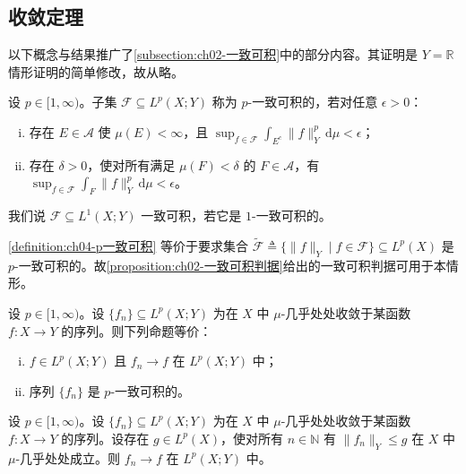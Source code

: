 \documentclass[../../main.tex]{subfiles}%
\begin{document}
\subsection{收敛定理}\label{subsection:ch04-收敛定理}

以下概念与结果推广了\cref{subsection:ch02-一致可积}中的部分内容。其证明是 $Y=\mathbb{R}$ 情形证明的简单修改，故从略。

\begin{definition}[$p$-一致可积]\label{definition:ch04-p一致可积}
设 $p\in[1,\infty)$。子集 $\mathcal{F}\subseteq L^p(X;Y)$ 称为 $p$-一致可积的，若对任意 $\epsilon>0$：
\begin{enumerate}[(i)]
\item\label{item:ch04-p一致可积-i} 存在 $E\in\mathcal{A}$ 使 $\mu(E)<\infty$，且 $\sup_{f\in\mathcal{F}}\int_{E^c}\|f\|_Y^p\,\mathrm{d}\mu<\epsilon$；
\item\label{item:ch04-p一致可积-ii} 存在 $\delta>0$，使对所有满足 $\mu(F)<\delta$ 的 $F\in\mathcal{A}$，有 $\sup_{f\in\mathcal{F}}\int_F\|f\|_Y^p\,\mathrm{d}\mu<\epsilon$。
\end{enumerate}
我们说 $\mathcal{F}\subseteq L^1(X;Y)$ 一致可积，若它是 $1$-一致可积的。
\end{definition}

\begin{remark}\label{remark:ch04-p一致可积}
\cref{definition:ch04-p一致可积} 等价于要求集合 $\widetilde{\mathcal{F}}\triangleq \{\|f\|_Y\mid f\in\mathcal{F}\}\subseteq L^p(X)$ 是 $p$-一致可积的。故\cref{proposition:ch02-一致可积判据}给出的一致可积判据可用于本情形。
\end{remark}

\begin{theorem}[Vitali]\label{theorem:ch04-Vitali}
设 $p\in[1,\infty)$。设 $\{f_n\}\subseteq L^p(X;Y)$ 为在 $X$ 中 $\mu$-几乎处处收敛于某函数 $f:X\to Y$ 的序列。则下列命题等价：
\begin{enumerate}[(i)]
\item\label{item:ch04-Vitali-i} $f\in L^p(X;Y)$ 且 $f_n\to f$ 在 $L^p(X;Y)$ 中；
\item\label{item:ch04-Vitali-ii} 序列 $\{f_n\}$ 是 $p$-一致可积的。
\end{enumerate}
\end{theorem}

\begin{theorem}[控制收敛定理]\label{theorem:ch04-控制收敛}
设 $p\in[1,\infty)$。设 $\{f_n\}\subseteq L^p(X;Y)$ 为在 $X$ 中 $\mu$-几乎处处收敛于某函数 $f:X\to Y$ 的序列。设存在 $g\in L^p(X)$，使对所有 $n\in\mathbb{N}$ 有 $\|f_n\|_Y\leqslant g$ 在 $X$ 中 $\mu$-几乎处处成立。则 $f_n\to f$ 在 $L^p(X;Y)$ 中。
\end{theorem}
\end{document}

